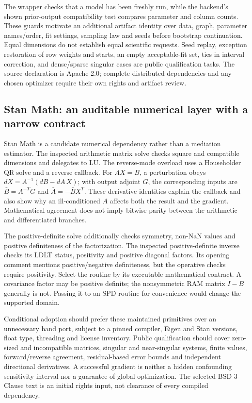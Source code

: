 The wrapper checks that a model has been freshly run, while the backend's shown
prior-output compatibility test compares parameter and column counts. These
guards motivate an additional artifact identity over data, graph, parameter
names/order, fit settings, sampling law and seeds before bootstrap continuation.
Equal dimensions do not establish equal scientific requests. Seed replay,
exception restoration of row weights and starts, an empty acceptable-fit set,
ties in interval correction, and dense/sparse singular cases are public
qualification tasks. The source declaration is Apache 2.0; complete distributed
dependencies and any chosen optimizer require their own rights and artifact
review.~\citep{exec25_cmed_openmx}

\subsection{Stan Math: an auditable numerical layer with a narrow contract}

Stan Math is a candidate numerical dependency rather than a mediation estimator.
The inspected arithmetic matrix solve checks square and compatible dimensions
and delegates to LU. The reverse-mode overload uses a Householder QR solve and
a reverse callback. For $AX=B$, a perturbation obeys
$dX=A^{-1}(dB-dA\,X)$; with output adjoint $G$, the corresponding inputs are
$\bar B=A^{-T}G$ and $\bar A=-\bar B X^T$. These derivative identities explain
the callback and also show why an ill-conditioned $A$ affects both the result
and the gradient. Mathematical agreement does not imply bitwise parity between
the arithmetic and differentiated branches.~\citep{exec25_cmed_stanmath}

The positive-definite solve additionally checks symmetry, non-NaN values and
positive definiteness of the factorization. The inspected positive-definite
inverse checks its LDLT status, positivity and positive diagonal factors. Its
opening comment mentions positive/negative definiteness, but the operative
checks require positivity. Select the routine by its executable mathematical
contract. A covariance factor may be positive definite; the nonsymmetric RAM
matrix $I-B$ generally is not. Passing it to an SPD routine for convenience would
change the supported domain.~\citep{exec25_cmed_stanmath}

Conditional adoption should prefer these maintained primitives over an
unnecessary hand port, subject to a pinned compiler, Eigen and Stan versions,
float type, threading and license inventory. Public qualification should cover
zero-sized and incompatible matrices, singular and near-singular systems,
finite values, forward/reverse agreement, residual-based error bounds and
independent directional derivatives. A successful gradient is neither a hidden
confounding sensitivity interval nor a guarantee of global optimization.
The selected BSD-3-Clause text is an initial rights input, not clearance of
every compiled dependency.~\citep{exec25_cmed_stanmath,exec25_cmed_choice}

